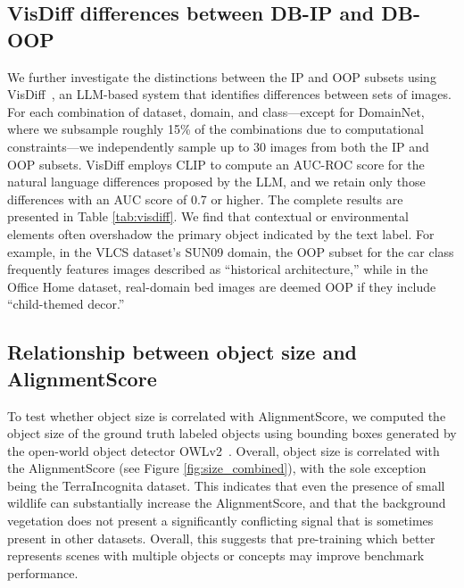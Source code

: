 \documentclass{article} %
\begin{document}
\subsection{VisDiff  differences between DB-IP and DB-OOP}
\label{sec:app_visdiff}

We further investigate the distinctions between the IP and OOP subsets using VisDiff~\citep{VisDiff}, an LLM-based system that identifies differences between sets of images. For each combination of dataset, domain, and class—except for DomainNet, where we subsample roughly 15\% of the combinations due to computational constraints—we independently sample up to 30 images from both the IP and OOP subsets. VisDiff employs CLIP to compute an AUC-ROC score for the natural language differences proposed by the LLM, and we retain only those differences with an AUC score of 0.7 or higher. The complete results are presented in Table \ref{tab:visdiff}. We find that contextual or environmental elements often overshadow the primary object indicated by the text label. For example, in the VLCS dataset’s SUN09 domain, the OOP subset for the car class frequently features images described as “historical architecture,” while in the Office Home dataset, real-domain bed images are deemed OOP if they include “child-themed decor.”



\subsection{Relationship between object size and AlignmentScore}

\label{sec:app_object size}

To test whether object size is correlated with AlignmentScore, we computed the object size of the ground truth labeled objects using bounding boxes generated by the open-world object detector OWLv2~\citep{minderer2023scaling}. Overall, object size is correlated with the AlignmentScore (see  Figure \ref{fig:size_combined}), with the sole exception being the TerraIncognita dataset. This indicates that even the presence of small wildlife can substantially increase the AlignmentScore, and that the background vegetation does not present a significantly conflicting signal that is sometimes present in other datasets.  Overall, this suggests that pre-training which better represents scenes with multiple objects or concepts may improve benchmark performance.
\end{document}
